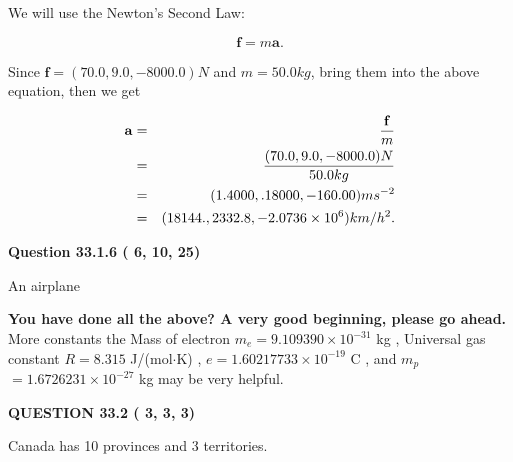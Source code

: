 \documentclass[12pt]{article}
\begin{document}
We will use the Newton's Second Law:
 
\[
\mathbf{f}=m\mathbf{a}.
\]
 
Since $\mathbf{f}=( %
70.0,  %
9.0,  %
-8000.0 )N$
and $m= %
50.0kg$, bring them into the above equation, then we get
 
\begin{eqnarray*}
\mathbf{a}&=&\frac{\mathbf{f}}m  \\
&=&\frac{(
70.0 ,
9.0 ,
-8000.0 )N
}{ %
50.0 kg}  \\
&=&(
1.4000 ,
.18000,
-160.00
)ms^{-2} \\
&=&(
18144. ,
2332.8 ,
-2.0736 \times 10^{6}
)km/h^2.
\end{eqnarray*}
 
 
 
  
\vspace{0.2in}
  
{\textbf{\Large{Question
33.1.6 
 (          6,         10,         25)
}}}
  
  
 
 
\noindent{}
 
 
An airplane
 
 
 
 
   
   
\vspace{0.3in}
{\textbf{\LARGE{You have done all the above? A very good beginning, please go ahead.}}}
More constants the
Mass of electron
$m_e$$ =
9.109390 \times 10^{-31} $
kg
,
Universal gas constant
$R$$ =
8.315 $
J/(mol$\cdot $K)
,
$e$$ =
1.60217733 \times 10^{-19} $
C
, and
$m_p$$ =
1.6726231 \times 10^{-27} $
kg
%
may be very helpful.
\vspace{0.3in}
   
   
  
\vspace{0.2in}
  
{\textbf{\Large{QUESTION
33.2 
 (          3,          3,          3)
}}}
  
  
 
 
\noindent{}
 
 
Canada has  %
10 provinces and  %
3 territories.
 
 
 
 
  
\vspace{0.2in}
  
\end{document}
